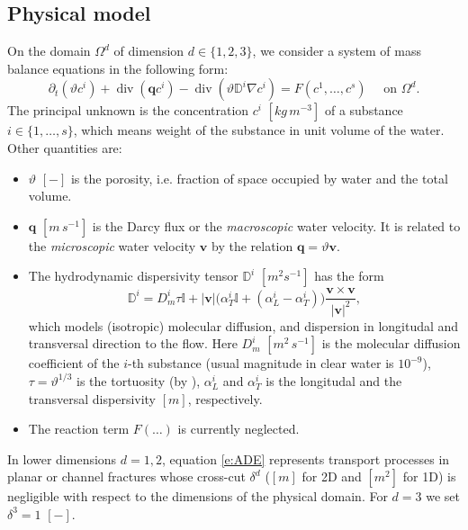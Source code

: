 \documentclass[a4paper]{article}
\def\abs#1{\lvert#1\rvert}
\def\D{{\tn D}}
\def\div{\operatorname{div}}
\def\grad{\nabla}
\def\vc#1{\mathbf{\boldsymbol{#1}}}     %
\def\th{\vartheta}
\def\tn#1{{\mathbb{#1}}}    %
\begin{document}
\subsection{Physical model}
On the domain $\Omega^d$ of dimension $d\in\{1,2,3\}$, we consider a system of mass balance equations in the following form:
\begin{equation}
    \label{e:ADE}
   \partial_t ( \th c^i) + \div ( \vc q c^i ) - \div (\th \D^i \grad c^i ) = F(c^1,\dots, c^s)  \quad \text{ on } \Omega^d.
\end{equation}
The principal unknown is the concentration $c^i$ $[kg\,m^{-3}]$ of a substance $i\in\{1,\dots, s\}$, which means weight of the substance in unit volume of the water.
Other quantities are:
\begin{itemize}
\item $\th$ $[-]$ is the porosity, i.e. fraction of space occupied by water and the total volume.
\item $\vc q$ $[m\,s^{-1}]$ is the Darcy flux or the \emph{macroscopic} water velocity.
It is related to the \emph{microscopic} water velocity $\vc v$ by the relation $\vc q = \th\vc v$.
\item The hydrodynamic dispersivity tensor $\D^i$ $[m^2 s^{-1}]$ has the form
\[
  \D^i =D_m^i \tau \tn I + \abs{\vc v}\big(\alpha_T^i \tn I + (\alpha_L^i - \alpha_T^i) \big) \frac{\vc v \times \vc v}{\abs{\vc v}^2},
\]
which models (isotropic) molecular diffusion, and dispersion in longitudal and transversal direction to the flow.
Here $D_m^i$ $[m^2\,s^{-1}]$ is the molecular diffusion coefficient of the $i$-th substance (usual magnitude in clear water is $10^{-9}$), $\tau=\th^{1/3}$ is the tortuosity (by \cite{millington_quirk}), $\alpha_L^i$ and $\alpha_T^i$ is the longitudal and the transversal dispersivity $[m]$, respectively.

\item The reaction term $F(\dots)$ is currently neglected.
\end{itemize}


In lower dimensions $d=1,2$, equation \eqref{e:ADE} represents transport processes in planar or channel fractures whose cross-cut $\delta^d$ ($[m]$ for 2D and $[m^2]$ for 1D) is negligible with respect to the dimensions of the physical domain.
For $d=3$ we set $\delta^3=1$ $[-]$.
\end{document}

